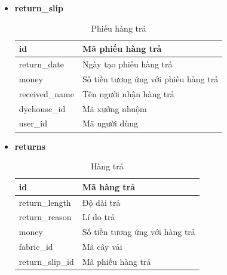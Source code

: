 \begin{itemize}
    \newpage
    \item \textbf{return\_slip}
    \begin{table}[H]
        \centering
        \begin{tabular}{|m{3cm}|m{10cm}|}
        \hline 
            id & Mã phiếu hàng trả\\ \hline
            return\_date & Ngày tạo phiếu hàng trả\\ \hline
            money & Số tiền tương ứng với phiếu hàng trả \\ \hline
            received\_name & Tên người nhận hàng trả\\ \hline
            dyehouse\_id & Mã xưởng nhuộm\\ \hline
            user\_id & Mã người dùng\\ 
        \hline 
        \end{tabular}
        \caption{Phiếu hàng trả}
        \label{return_slip}
    \end{table}
    
    \item \textbf{returns}
    \begin{table}[H]
        \centering
        \begin{tabular}{|m{3cm}|m{10cm}|}
        \hline 
            id & Mã hàng trả\\ \hline
            return\_length & Độ dài trả\\ \hline
            return\_reason & Lí do trả \\ \hline
            money & Số tiền tương ứng với hàng trả\\ \hline
            fabric\_id & Mã cây vải\\ \hline
            return\_slip\_id & Mã phiếu hàng trả\\ 
        \hline 
        \end{tabular}
        \caption{Hàng trả}
        \label{returns}
    \end{table}


\end{itemize}


\newpage
